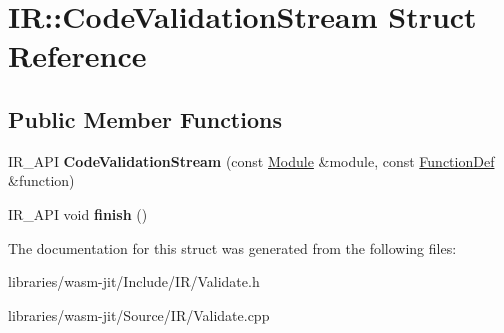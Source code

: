 \hypertarget{struct_i_r_1_1_code_validation_stream}{}\section{IR\+:\+:Code\+Validation\+Stream Struct Reference}
\label{struct_i_r_1_1_code_validation_stream}
\subsection*{Public Member Functions}
\begin{DoxyCompactItemize}
\item 
\mbox{\label{struct_i_r_1_1_code_validation_stream_a6ccf3c90dcc91490e552b3db8e31601b}} 
I\+R\+\_\+\+A\+PI {\bfseries Code\+Validation\+Stream} (const \mbox{\hyperlink{struct_i_r_1_1_module}{Module}} \&module, const \mbox{\hyperlink{struct_i_r_1_1_function_def}{Function\+Def}} \&function)
\item 
\mbox{\label{struct_i_r_1_1_code_validation_stream_a7b3f5a99b18e33290b74a36a79004370}} 
I\+R\+\_\+\+A\+PI void {\bfseries finish} ()
\end{DoxyCompactItemize}


The documentation for this struct was generated from the following files\+:\begin{DoxyCompactItemize}
\item 
libraries/wasm-\/jit/\+Include/\+I\+R/Validate.\+h\item 
libraries/wasm-\/jit/\+Source/\+I\+R/Validate.\+cpp\end{DoxyCompactItemize}
